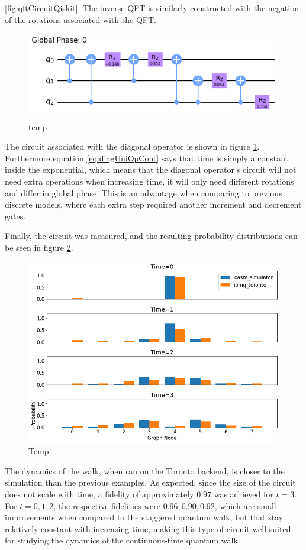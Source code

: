 \documentclass[../../dissertation.tex]{subfiles}
\begin{document}
\ref{fig:qftCircuitQiskit}. The inverse QFT is similarly constructed with the
negation of the rotations associated with the QFT.\par
\begin{figure}[!h]
	\centering
	\includegraphics[scale=0.50]{img/Qiskit/ContQuantumWalk/Circuits/circDiag_N3_S1.png}
	\caption{temp}
	\label{fig:diagCircuitQiskit}
\end{figure}
The circuit associated with the diagonal operator is shown in figure
\ref{fig:diagCircuitQiskit}. Furthermore equation \ref{eq:diagUniOpCont} says
that time is simply a constant inside the exponential, which means that the
diagonal operator's circuit will not need extra operations when increasing
time, it will only need different rotations and differ in global phase.  This
is an advantage when comparing to previous discrete models,  where each extra
step required another increment and decrement gates.\par

Finally, the circuit was measured, and the resulting probability distributions
can be seen in figure \ref{fig:contQWQiskitDist}.
\begin{figure}[!h]
	\centering
	\includegraphics[scale=0.4]{img/Qiskit/ContQuantumWalk/ContQW_N3_S0123.png}
	\caption{Temp} 
	\label{fig:contQWQiskitDist}
\end{figure}
The dynamics of the walk, when ran on the Toronto backend, is closer to the
simulation than the previous examples. As expected, since the size of the
circuit does not scale with time, a fidelity of approximately $0.97$ was
achieved for $t=3$. For $t=0,1,2$, the respective fidelities were $0.96, 0.90,
0.92$, which are small improvements when compared to the staggered quantum
walk, but that stay relatively constant with increasing time, making this type
of circuit well suited for studying the dynamics of the continuous-time quantum
walk.
\end{document}
